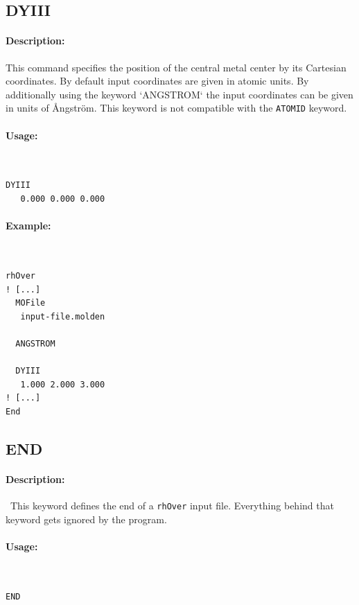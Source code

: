 \documentclass[11pt]{article}
\begin{document}
\clearpage
\subsection{DYIII}

\paragraph{Description:} This command specifies the position of the central metal center by its Cartesian coordinates. By default input coordinates are given in atomic units. By additionally using the keyword `ANGSTROM` the input coordinates can be given in units of \AA ngstr\"{o}m. This keyword is not compatible with the \texttt{ATOMID} keyword.

\paragraph{Usage:}~ 

\begin{lstlisting}[frame=single]
  DYIII
   0.000 0.000 0.000
\end{lstlisting}

\paragraph{Example:}~ 

\begin{lstlisting}[frame=single]
rhOver
! [...]
  MOFile
   input-file.molden

  ANGSTROM
  
  DYIII
   1.000 2.000 3.000
! [...]
End
\end{lstlisting}

\clearpage
\subsection{END}

\paragraph{Description:}~This keyword defines the end of a \texttt{rhOver} input file. Everything behind that keyword gets ignored by the program.

\paragraph{Usage:}~ 

\begin{lstlisting}[frame=single]
  END
\end{lstlisting}
\end{document}
